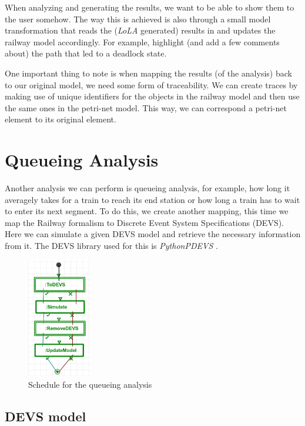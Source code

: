 \documentclass{article}
\begin{document}
When analyzing and generating the results, we want to be able to show them to the user somehow. The way this is achieved is also through a small model transformation that reads the (\textit{LoLA} generated) results in and updates the railway model accordingly. For example, highlight (and add a few comments about) the path that led to a deadlock state.

One important thing to note is when mapping the results (of the analysis) back to our original model, we need some form of traceability. We can create traces by making use of unique identifiers for the objects in the railway model and then use the same ones in the petri-net model. This way, we can correspond a petri-net element to its original element.


\section{Queueing Analysis}

Another analysis we can perform is queueing analysis, for example, how long it averagely takes for a train to reach its end station or how long a train has to wait to enter its next segment. To do this, we create another mapping, this time we map the Railway formalism to Discrete Event System Specifications (DEVS). Here we can simulate a given DEVS model and retrieve the necessary information from it. The DEVS library used for this is \textit{PythonPDEVS} \cite{pythonpdevs}.

\begin{figure}[H]
    \centering
    \includegraphics[width=0.25\textwidth]{images/queueing_analysis_schedule.png}
    \caption{Schedule for the queueing analysis}
    \label{schedule_queueing}
\end{figure}

\subsection{DEVS model}
\end{document}
